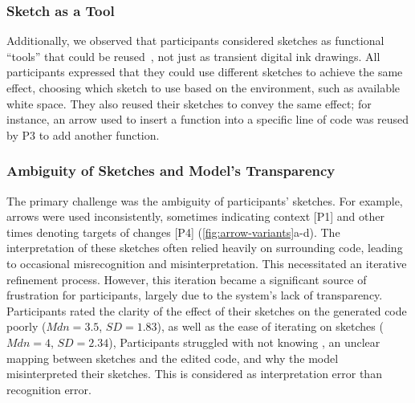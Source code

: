 \subsubsection{Sketch as a Tool} 
Additionally, we observed that participants considered sketches as functional ``tools'' that could be reused~\cite{renom2022exploring}, not just as transient digital ink drawings. All participants expressed that they could use different sketches to achieve the same effect, choosing which sketch to use based on the environment, such as available white space. They also reused their sketches to convey the same effect; for instance, an arrow used to insert a function into a specific line of code was reused by P3 to add another function.





\subsubsection{Ambiguity of Sketches and Model's Transparency}
The primary challenge was the ambiguity of participants' sketches. For example, arrows were used inconsistently, sometimes indicating context [P1] and other times denoting targets of changes [P4] (\autoref{fig:arrow-variants}a-d).
The interpretation of these sketches often relied heavily on surrounding code, leading to occasional misrecognition and misinterpretation. 
This necessitated an iterative refinement process.
However, this iteration became a significant source of frustration for participants, largely due to the system's lack of transparency.
Participants rated the clarity of the effect of their sketches on the generated code poorly ($Mdn=3.5$, $SD=1.83$), as well as the ease of iterating on sketches ($Mdn=4$, $SD=2.34$), 
Participants struggled with not knowing , an unclear mapping between sketches and the edited code, and why the model misinterpreted their sketches.
This is considered as interpretation error than recognition error.




